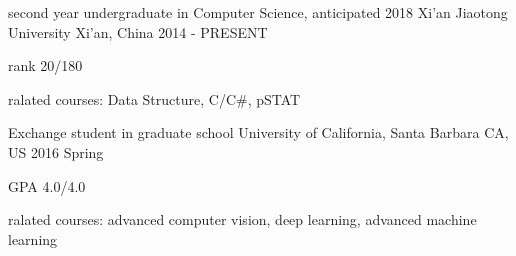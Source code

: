 

\begin{cventries}

  \cventry
    {second year undergraduate in Computer Science, anticipated 2018} %
    {Xi'an Jiaotong University} %
    {Xi'an, China} %
    {2014 - PRESENT} %
    {
      \begin{cvitems} %
        \item {rank 20/180}
        \item {ralated courses: Data Structure, C/C\#, pSTAT}
      \end{cvitems}
    }
    
  \cventry
    {Exchange student in graduate school} %
    {University of California, Santa Barbara} %
    {CA, US} %
    {2016 Spring} %
    {
      \begin{cvitems} %
        \item {GPA 4.0/4.0}
        \item {ralated courses: advanced computer vision, deep learning, advanced machine learning}
      \end{cvitems}
    }

\end{cventries}
